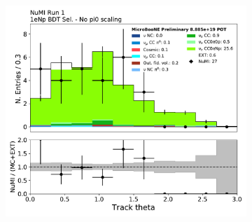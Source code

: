 \begin{figure}[H]
\begin{subfigure}{0.3\textwidth}
    \caption{}
    \end{subfigure}
    \begin{subfigure}{0.3\textwidth}
    \includegraphics[width=1.0\textwidth]{Sidebands/Figures/NuMI/1eNp/BDTSel/trk_theta.pdf}
    \caption{}
    \end{subfigure}
    \caption{} 
    \label{fig:NuMI_1eNp_9}
\end{figure}

